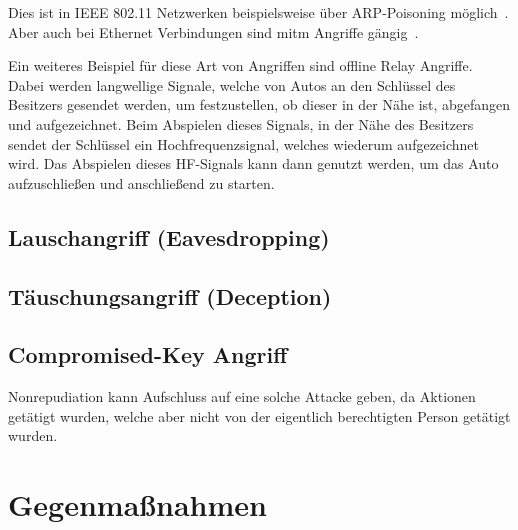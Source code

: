 \documentclass[final,bibliography=totocnumbered]{include/sikseminar}
\begin{document}
Dies ist in IEEE 802.11 Netzwerken beispielsweise über ARP-Poisoning möglich~\cite{FIT+2012}.
Aber auch bei Ethernet Verbindungen sind \gls{mitm} Angriffe gängig~\cite{HLL+17}.

Ein weiteres Beispiel für diese Art von Angriffen sind offline Relay Angriffe.
Dabei werden langwellige Signale, welche von Autos an den Schlüssel des Besitzers gesendet werden, um festzustellen, ob dieser in der Nähe ist, abgefangen und aufgezeichnet.
Beim Abspielen dieses Signals, in der Nähe des Besitzers sendet der Schlüssel ein Hochfrequenzsignal, welches wiederum aufgezeichnet wird.
Das Abspielen dieses HF-Signals kann dann genutzt werden, um das Auto aufzuschließen und anschließend zu starten.~\cite{HLL+17}

\subsection{Lauschangriff (Eavesdropping)}\label{subsec:lauschen} %

\subsection{T\"auschungsangriff (Deception)}\label{subsec:tauschung} %




\subsection{Compromised-Key Angriff}\label{subsec:key}

Nonrepudiation kann Aufschluss auf eine solche Attacke geben, da Aktionen getätigt wurden, welche aber nicht von der eigentlich berechtigten Person getätigt wurden.



\section{Gegenmaßnahmen}\label{sec:gegenmassnahmen}


\end{document}
